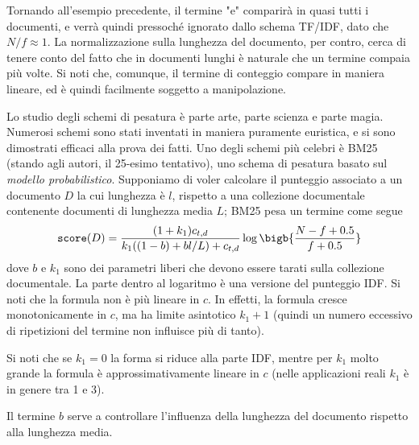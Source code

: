 Tornando all'esempio precedente, il termine "e" comparirà in quasi tutti i documenti, e verrà quindi pressoché ignorato dallo schema TF/IDF, dato che $N / f \approx 1$. La normalizzazione sulla lunghezza del documento, per contro, cerca di tenere conto del fatto che in documenti lunghi è naturale che un termine compaia più volte. Si noti che, comunque, il termine di conteggio compare in maniera lineare, ed è quindi facilmente soggetto a manipolazione.

Lo studio degli schemi di pesatura è parte arte, parte scienza e parte magia. Numerosi schemi sono stati inventati in maniera puramente euristica, e si sono dimostrati efficaci alla prova dei fatti. Uno degli schemi più celebri è BM25 (stando agli autori, il 25-esimo tentativo), uno schema di pesatura basato sul \textit{modello probabilistico}. Supponiamo di voler calcolare il punteggio associato a un documento $D$ la cui lunghezza è $l$, rispetto a una collezione documentale contenente documenti di lunghezza media $L$; BM25 pesa un termine come segue
\begin{equation}
	\texttt{score}(D) = \frac{(1 + k_1)c_{t, d}}{k_1((1 - b) + bl / L) + c_{t, d}}\log\bigb{\frac{N - f + 0.5}{f + 0.5}}
\end{equation}
dove $b$ e $k_1$ sono dei parametri liberi che devono essere tarati sulla collezione documentale. La parte dentro al logaritmo è una versione del punteggio IDF. Si noti che la formula non è più lineare in $c$. In effetti, la formula cresce monotonicamente in $c$, ma ha limite asintotico $k_1 + 1$ (quindi un numero eccessivo di ripetizioni del termine non influisce più di tanto).

Si noti che se $k_1 = 0$ la forma si riduce alla parte IDF, mentre per $k_1$ molto grande la formula è approssimativamente lineare in $c$ (nelle applicazioni reali $k_1$ è in genere tra 1 e 3).

Il termine $b$ serve a controllare l'influenza della lunghezza del documento rispetto alla lunghezza media.
